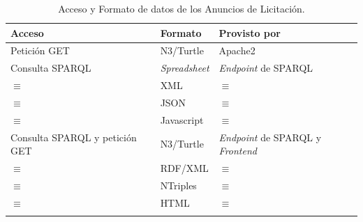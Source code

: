 \begin{longtable}[c]{|p{4cm}|p{4cm}|p{4cm}|} 
\hline
  \textbf{Acceso} &  \textbf{Formato} &  \textbf{Provisto por}  \\\hline
\endhead
 Petición GET    & N3/Turtle    & Apache2 \\ \hline
 Consulta SPARQL & \textit{Spreadsheet}  & \textit{Endpoint} de SPARQL  \\ \hline
 $\equiv$        & XML 		& $\equiv$ \\ \hline
 $\equiv$        & JSON 	& $\equiv$ \\ \hline
 $\equiv$        & Javascript 	& $\equiv$  \\ \hline 
 Consulta SPARQL y petición GET      & N3/Turtle 	& \textit{Endpoint} de SPARQL y \linkeddata \textit{Frontend} \\ \hline
 $\equiv$        & RDF/XML 	& $\equiv$ \\ \hline
 $\equiv$        & NTriples 	& $\equiv$  \\ \hline
 $\equiv$        & HTML 	& $\equiv$  \\ \hline
 \hline
\caption{Acceso y Formato de datos de los Anuncios de Licitación.}\label{table:pscs-acceso}\\    
\end{longtable}

